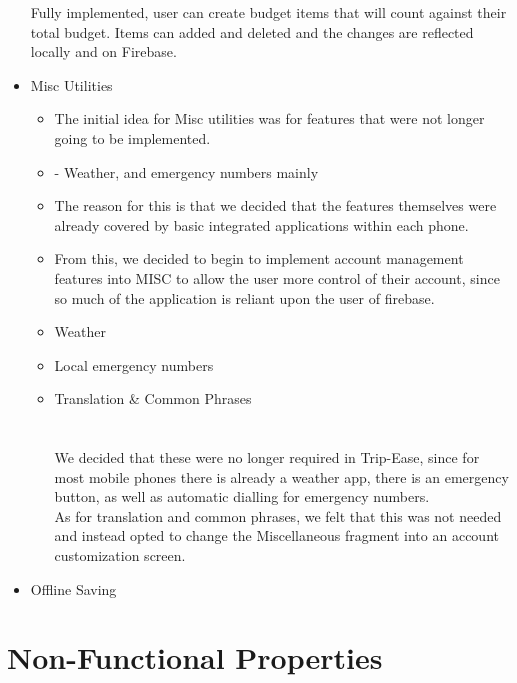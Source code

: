 \documentclass[12pt]{article}
\begin{document}
\begin{itemize}
			Fully implemented, user can create budget items that will count against their total budget.
			Items can added and deleted and the changes are reflected locally and on Firebase.

		\item{Misc Utilities}
		\begin{itemize}
			\item 	The initial idea for Misc utilities was for features that were not longer going to be implemented.
			\item 	- Weather, and emergency numbers mainly
			\item 	The reason for this is that we decided that the features themselves were already covered by basic integrated applications within each phone.
			\item 	From this, we decided to begin to implement account management features into MISC to allow the user more control of their account, since so much of the	application is reliant upon the user of firebase.
		\end{itemize}



		\begin{itemize}
			\item Weather
			\item Local emergency numbers
			\item Translation \& Common Phrases
			\\
			\\
			\\
			We decided that these were no longer required in Trip-Ease, since for most mobile phones there is already a weather app, there is an emergency button, as well as automatic dialling for emergency numbers.\\
			As for translation and common phrases, we felt that this was not needed and instead opted to change the Miscellaneous fragment into an account customization screen.
		\end{itemize}

		\item{Offline Saving}

	\end{itemize}

	\section*{Non-Functional Properties}
\end{document}
